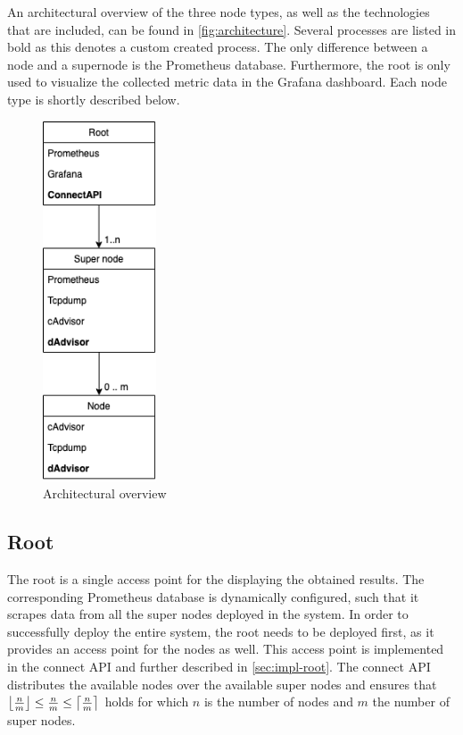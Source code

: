 \noindent
An architectural overview of the three node types, as well as the technologies that are included, can be found in \autoref{fig:architecture}. Several processes are listed in bold as this denotes a custom created process. The only difference between a node and a supernode is the Prometheus database. Furthermore, the root is only used to visualize the collected metric data in the Grafana dashboard. Each node type is shortly described below.

\begin{figure}
    \centering
    \includegraphics[width=0.3\textwidth]{gfx/architecture.png}
    \caption{Architectural overview}
    \label{fig:architecture}
\end{figure}

\subsection{Root}
The root is a single access point for the displaying the obtained results. The corresponding Prometheus database is dynamically configured, such that it scrapes data from all the super nodes deployed in the system. 
In order to successfully deploy the entire system, the root needs to be deployed first, as it provides an access point for the nodes as well. This access point is implemented in the connect API and further described in \autoref{sec:impl-root}. The connect API distributes the available nodes over the available super nodes and ensures that $\floor*{\frac{n}{m}} \leq \frac{n}{m} \leq \ceil*{\frac{n}{m}}$ holds for which $n$ is the number of nodes and $m$ the number of super nodes.

